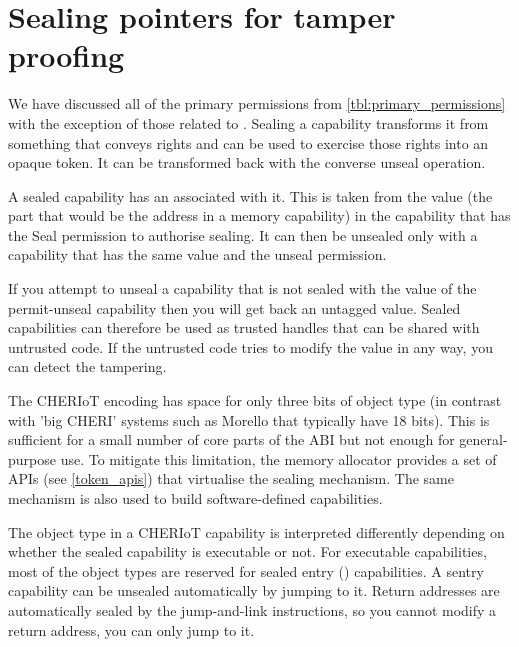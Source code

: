 \section[label=sealing_intro]{Sealing pointers for tamper proofing}

We have discussed all of the primary permissions from \ref{tbl:primary_permissions} with the exception of those related to .
Sealing a capability transforms it from something that conveys rights and can be used to exercise those rights into an opaque token.
It can be transformed back with the converse unseal operation.

A sealed capability has an  associated with it.
This is taken from the value (the part that would be the address in a memory capability) in the capability that has the Seal permission to authorise sealing.
It can then be unsealed only with a capability that has the same value and the unseal permission.

If you attempt to unseal a capability that is not sealed with the value of the permit-unseal capability then you will get back an untagged value.
Sealed capabilities can therefore be used as trusted handles that can be shared with untrusted code.
If the untrusted code tries to modify the value in any way, you can detect the tampering.

The CHERIoT encoding has space for only three bits of object type (in contrast with 'big CHERI' systems such as Morello that typically have 18 bits).
This is sufficient for a small number of core parts of the ABI but not enough for general-purpose use.
To mitigate this limitation, the memory allocator provides a set of APIs (see \ref{token_apis}) that virtualise the sealing mechanism.
The same mechanism is also used to build software-defined capabilities.

The object type in a CHERIoT capability is interpreted differently depending on whether the sealed capability is executable or not.
For executable capabilities, most of the object types are reserved for sealed entry () capabilities.
A sentry capability can be unsealed automatically by jumping to it.
Return addresses are automatically sealed by the jump-and-link instructions, so you cannot modify a return address, you can only jump to it.

